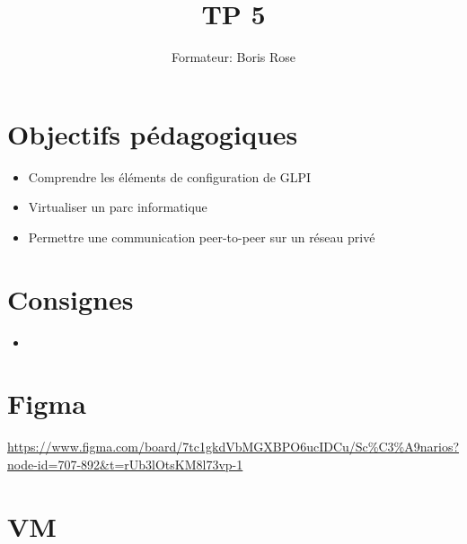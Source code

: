 \documentclass[12pt, letterpaper]{article}
\title{TP 5}
\author{Formateur: Boris Rose}
\date{}
\begin{document}
\maketitle

\section{Objectifs pédagogiques}

\begin{tcolorbox}[colback=cyan!5,colframe=cyan!60!black,title=Objectifs]
   \begin{itemize}
    \item Comprendre les éléments de configuration de GLPI 
    \item Virtualiser un parc informatique 
    \item Permettre une communication peer-to-peer sur un réseau privé
   \end{itemize}
\end{tcolorbox}


\section{Consignes}
\begin{tcolorbox}[colback=cyan!5,colframe=cyan!60!black,title=Consignes]
   \begin{itemize}
    \item 
   \end{itemize}
\end{tcolorbox}




\section{Figma}

\begin{tcolorbox}[colback=cyan!5,colframe=cyan!60!black,title=Figma du Cours]
    \url{https://www.figma.com/board/7tc1gkdVbMGXBPO6ucIDCu/Sc%C3%A9narios?node-id=707-892&t=rUb3lOtsKM8l73vp-1}
\end{tcolorbox}







\section{VM}
\end{document}
